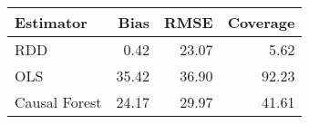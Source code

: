 \begin{table}[ht]
\centering
\begin{tabular}{lrrr}
  \hline
Estimator & Bias & RMSE & Coverage \\ 
  \hline
RDD & 0.42 & 23.07 & 5.62 \\ 
  OLS & 35.42 & 36.90 & 92.23 \\ 
  Causal Forest & 24.17 & 29.97 & 41.61 \\ 
   \hline
\end{tabular}
\end{table}
